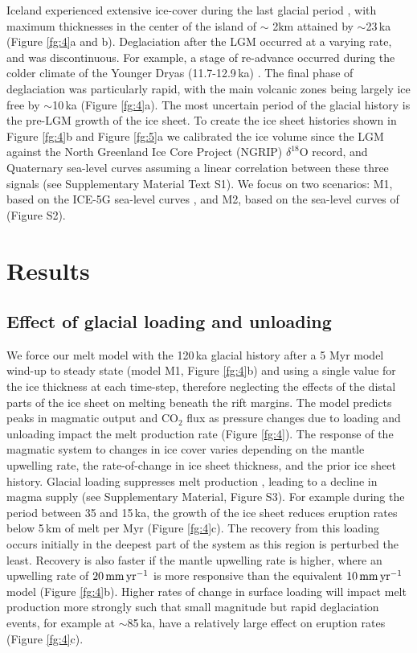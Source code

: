 \documentclass[draft,linenumbers]{agujournal2018}
\begin{document}
Iceland experienced extensive ice-cover during the last glacial period \citep{patton-etal-2017}, with maximum thicknesses in the center of the island of $\sim$ 2km attained by $\sim$23\,ka (Figure \ref{fg:4}a and b). Deglaciation after the LGM occurred at a varying rate, and was discontinuous. For example, a stage of re-advance occurred during the colder climate of the Younger Dryas (11.7-12.9\,ka) \citep{nordahl-2015}. The final phase of deglaciation was particularly rapid, with the main volcanic zones being largely ice free by $\sim$10\,ka (Figure \ref{fg:4}a). The most uncertain period of the glacial history is the pre-LGM growth of the ice sheet. To create the ice sheet histories shown in Figure \ref{fg:4}b and Figure \ref{fg:5}a we calibrated the ice volume since the LGM against the North Greenland Ice Core Project (NGRIP) $\delta^{18}$O record, and Quaternary sea-level curves assuming a linear correlation between these three signals (see Supplementary Material Text S1). We focus on two scenarios: M1, based on the ICE-5G sea-level curves \citep{peltier-2004}, and M2, based on the sea-level curves of \citet{pico-etal-2017} (Figure S2).

\section{Results}
\subsection{Effect of glacial loading and unloading}

We force our melt model with the 120\,ka glacial history after a 5 Myr model wind-up to steady state (model M1, Figure \ref{fg:4}b) and using a single value for the ice thickness at each time-step, therefore neglecting the effects of the distal parts of the ice sheet on melting beneath the rift margins. The model predicts peaks in magmatic output and CO$_{2}$ flux as pressure changes due to loading and unloading impact the melt production rate (Figure \ref{fg:4}). The response of the magmatic system to changes in ice cover varies depending on the mantle upwelling rate, the rate-of-change in ice sheet thickness, and the prior ice sheet history. Glacial loading suppresses melt production \citep{jull-1996}, leading to a decline in magma supply (see Supplementary Material, Figure S3). For example during the period between 35 and 15\,ka, the growth of the ice sheet reduces eruption rates below 5\,km of melt per Myr (Figure \ref{fg:4}c). The recovery from this loading occurs initially in the deepest part of the system as this region is perturbed the least. Recovery is also faster if the mantle upwelling rate is higher, where an upwelling rate of $20\rm\,mm\,yr^{-1}$ is more responsive than the equivalent $10\rm\,mm\,yr^{-1}$ model (Figure \ref{fg:4}b). Higher rates of change in surface loading will impact melt production more strongly such that small magnitude but rapid deglaciation events, for example at $\sim$85\,ka, have a relatively large effect on eruption rates (Figure \ref{fg:4}c).
\end{document}

